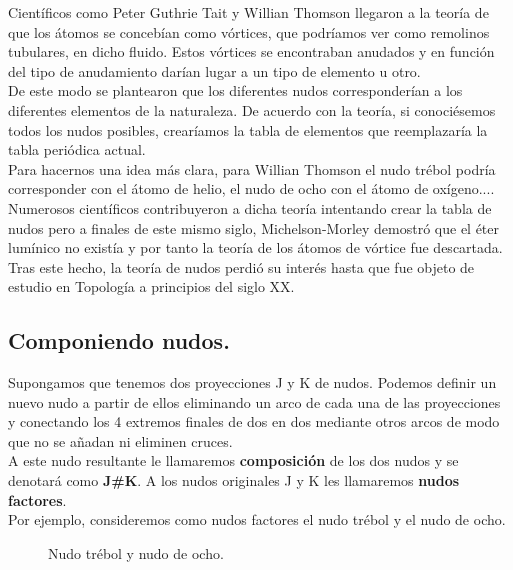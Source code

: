 \documentclass[14pt]{extarticle}
\begin{document}
Científicos como Peter Guthrie Tait y Willian Thomson llegaron a la teoría de que los átomos se concebían como vórtices, que podríamos ver como remolinos tubulares, en dicho fluido. Estos vórtices se encontraban anudados y en función del tipo de anudamiento darían lugar a un tipo de elemento u otro.\\
De este modo se plantearon que los diferentes nudos corresponderían a los diferentes elementos de la naturaleza. De acuerdo con la teoría, si conociésemos todos los nudos posibles, crearíamos la tabla de elementos que reemplazaría la tabla periódica actual. \\

Para hacernos una idea más clara, para Willian Thomson el nudo trébol podría corresponder con el átomo de helio, el nudo de ocho con el átomo de oxígeno....\\

Numerosos científicos contribuyeron a dicha teoría intentando crear la tabla de nudos pero a finales de este mismo siglo, Michelson-Morley demostró que el éter lumínico no existía y por tanto la teoría de los átomos de vórtice fue descartada. \\

Tras este hecho, la teoría de nudos perdió su interés hasta que fue objeto de estudio en Topología a principios del siglo XX.


\newpage
\subsection{Componiendo nudos.}
Supongamos que tenemos dos proyecciones J y K de nudos. Podemos definir un nuevo nudo a partir de ellos eliminando un arco de cada una de las proyecciones y conectando los 4 extremos finales de dos en dos mediante otros arcos de modo que no se añadan ni eliminen cruces.\\
A este nudo resultante le llamaremos \textbf{composición} de los dos nudos y se denotará como \textbf{J\#K}. A los nudos originales J y K les llamaremos \textbf{nudos factores}. \\

Por ejemplo, consideremos como nudos factores el nudo trébol y el nudo de ocho. 
  \begin{figure}[h!]
  	\centering
  	\caption{Nudo trébol y nudo de ocho.}
  	\label{comp1} 
  \end{figure}
  
\end{document}
